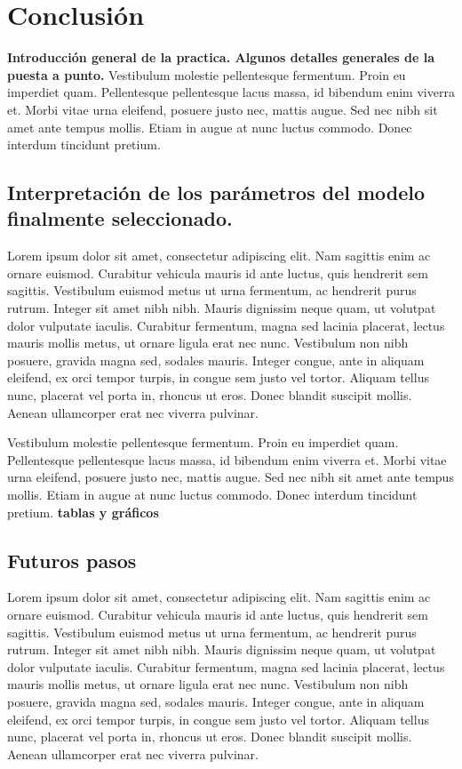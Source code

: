 \documentclass[a4paper,12pt,twocolumn]{article}
\begin{document}
\section{Conclusión}
\textbf{Introducción general de la practica. Algunos detalles generales de la puesta a punto.}
Vestibulum molestie pellentesque fermentum. Proin eu imperdiet quam. Pellentesque pellentesque lacus massa, id bibendum enim viverra et. Morbi vitae urna eleifend, posuere justo nec, mattis augue. Sed nec nibh sit amet ante tempus mollis. Etiam in augue at nunc luctus commodo. Donec interdum tincidunt pretium. 
\subsection{Interpretación de los parámetros del modelo finalmente seleccionado.}
 Lorem ipsum dolor sit amet, consectetur adipiscing elit. Nam sagittis enim ac ornare euismod. Curabitur vehicula mauris id ante luctus, quis hendrerit sem sagittis. Vestibulum euismod metus ut urna fermentum, ac hendrerit purus rutrum. Integer sit amet nibh nibh. Mauris dignissim neque quam, ut volutpat dolor vulputate iaculis. Curabitur fermentum, magna sed lacinia placerat, lectus mauris mollis metus, ut ornare ligula erat nec nunc. Vestibulum non nibh posuere, gravida magna sed, sodales mauris. Integer congue, ante in aliquam eleifend, ex orci tempor turpis, in congue sem justo vel tortor. Aliquam tellus nunc, placerat vel porta in, rhoncus ut eros. Donec blandit suscipit mollis. Aenean ullamcorper erat nec viverra pulvinar.

Vestibulum molestie pellentesque fermentum. Proin eu imperdiet quam. Pellentesque pellentesque lacus massa, id bibendum enim viverra et. Morbi vitae urna eleifend, posuere justo nec, mattis augue. Sed nec nibh sit amet ante tempus mollis. Etiam in augue at nunc luctus commodo. Donec interdum tincidunt pretium. 
\textbf{tablas y gráficos}
\subsection{Futuros pasos}
 Lorem ipsum dolor sit amet, consectetur adipiscing elit. Nam sagittis enim ac ornare euismod. Curabitur vehicula mauris id ante luctus, quis hendrerit sem sagittis. Vestibulum euismod metus ut urna fermentum, ac hendrerit purus rutrum. Integer sit amet nibh nibh. Mauris dignissim neque quam, ut volutpat dolor vulputate iaculis. Curabitur fermentum, magna sed lacinia placerat, lectus mauris mollis metus, ut ornare ligula erat nec nunc. Vestibulum non nibh posuere, gravida magna sed, sodales mauris. Integer congue, ante in aliquam eleifend, ex orci tempor turpis, in congue sem justo vel tortor. Aliquam tellus nunc, placerat vel porta in, rhoncus ut eros. Donec blandit suscipit mollis. Aenean ullamcorper erat nec viverra pulvinar.
\end{document}
